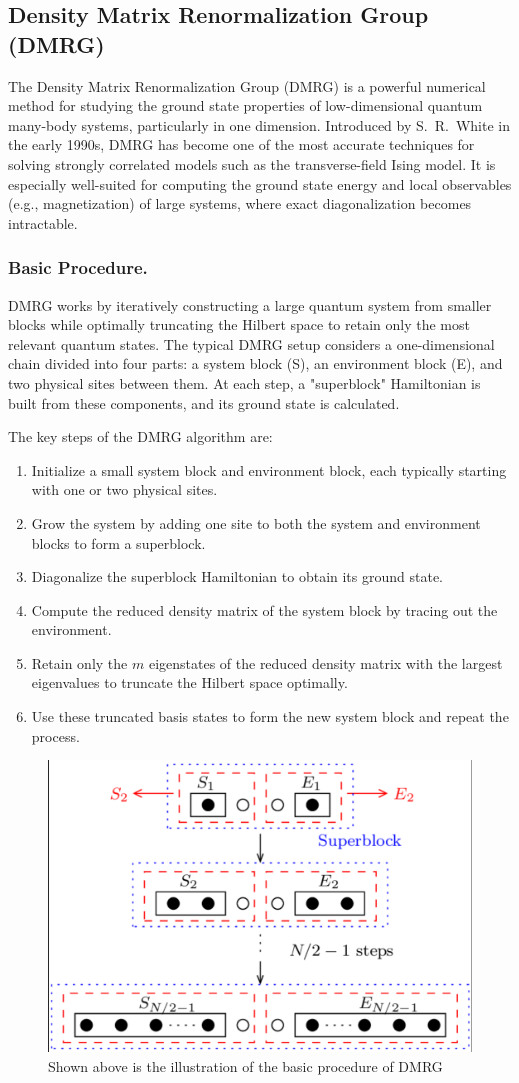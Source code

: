 \documentclass[a4paper]{article}
\begin{document}
\subsection{Density Matrix Renormalization Group (DMRG)}
The Density Matrix Renormalization Group (DMRG) is a powerful numerical method for studying the ground state properties of low-dimensional quantum many-body systems, particularly in one dimension. Introduced by S.~R.~White in the early 1990s, DMRG has become one of the most accurate techniques for solving strongly correlated models such as the transverse-field Ising model. It is especially well-suited for computing the ground state energy and local observables (e.g., magnetization) of large systems, where exact diagonalization becomes intractable.

\subsubsection{Basic Procedure.}
DMRG works by iteratively constructing a large quantum system from smaller blocks while optimally truncating the Hilbert space to retain only the most relevant quantum states. The typical DMRG setup considers a one-dimensional chain divided into four parts: a system block (S), an environment block (E), and two physical sites between them. At each step, a "superblock" Hamiltonian is built from these components, and its ground state is calculated.

The key steps of the DMRG algorithm are:
\begin{enumerate}
    \item Initialize a small system block and environment block, each typically starting with one or two physical sites.
    \item Grow the system by adding one site to both the system and environment blocks to form a superblock.
    \item Diagonalize the superblock Hamiltonian to obtain its ground state.
    \item Compute the reduced density matrix of the system block by tracing out the environment.
    \item Retain only the $m$ eigenstates of the reduced density matrix with the largest eigenvalues to truncate the Hilbert space optimally.
    \item Use these truncated basis states to form the new system block and repeat the process.
\end{enumerate}

\begin{figure}
    \centering
    \includegraphics[width=0.5\linewidth]{屏幕截图 2025-05-30 165036.png}
    \caption{Shown above is the illustration of the basic procedure of DMRG}
    \label{fig:enter-label}
\end{figure}
\end{document}
